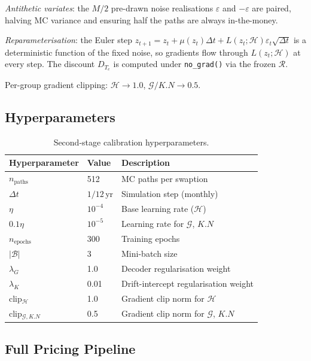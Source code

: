 \emph{Antithetic variates}: the $M/2$ pre-drawn noise realisations $\varepsilon$ and
$-\varepsilon$ are paired, halving MC variance and ensuring half the paths are always
in-the-money.

\emph{Reparameterisation}: the Euler step
$z_{t+1}=z_t+\mu(z_t)\Delta t + L(z_t;\mathcal{H})\varepsilon_t\sqrt{\Delta t}$
is a deterministic function of the fixed noise, so gradients flow through
$L(z_t;\mathcal{H})$ at every step. The discount $D_{T_e}$ is computed under
\texttt{no\_grad()} via the frozen $\mathcal{R}$.

Per-group gradient clipping: $\mathcal{H}\to1.0$, $\mathcal{G}/K.N\to0.5$.

\subsection{Hyperparameters}
\label{subsec:hyperparams}

\begin{table}[H]
\centering
\caption{Second-stage calibration hyperparameters.}
\label{tab:stage2_hyperparams}
\begin{tabular}{@{}lll@{}}
\toprule
\textbf{Hyperparameter} & \textbf{Value} & \textbf{Description} \\
\midrule
$n_{\mathrm{paths}}$   & 512       & MC paths per swaption \\
$\Delta t$             & $1/12$\,yr & Simulation step (monthly) \\
$\eta$                 & $10^{-4}$ & Base learning rate ($\mathcal{H}$) \\
$0.1\eta$              & $10^{-5}$ & Learning rate for $\mathcal{G}$, $K.N$ \\
$n_{\mathrm{epochs}}$  & 300       & Training epochs \\
$|\mathcal{B}|$        & 3         & Mini-batch size \\
$\lambda_G$            & 1.0       & Decoder regularisation weight \\
$\lambda_K$            & 0.01      & Drift-intercept regularisation weight \\
clip$_\mathcal{H}$     & 1.0       & Gradient clip norm for $\mathcal{H}$ \\
clip$_{\mathcal{G},K.N}$ & 0.5     & Gradient clip norm for $\mathcal{G}$, $K.N$ \\
\bottomrule
\end{tabular}
\end{table}

\subsection{Full Pricing Pipeline}
\label{subsec:pricing_pipeline}

